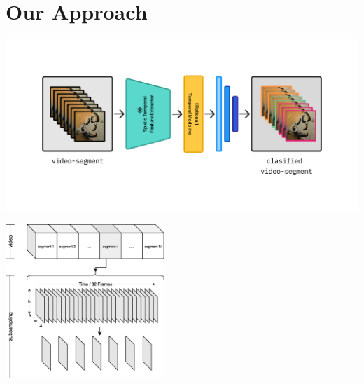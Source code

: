 \section{Our Approach}

\begin{frame}

    \centering

    \includegraphics[width=1\textwidth]{../../assets/figures/model-overview.presentation.png}

\end{frame}

\begin{frame}

    \vspace{1em}

    \centering

    \includegraphics[width=0.45\textwidth]{../../assets/figures/subsampling.png}
\end{frame}

